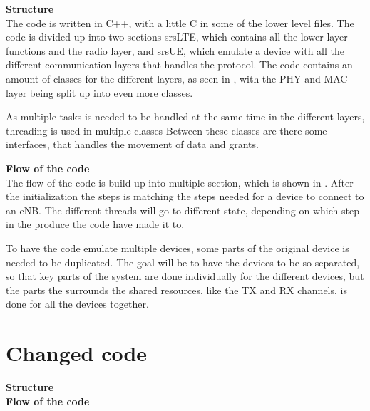 \textbf{Structure}\\
The code is written in C++, with a little C in some of the lower level files. The code is divided up into two sections srsLTE, which contains all the lower layer functions and the radio layer, and srsUE, which emulate a device with all the different communication layers that handles the protocol. The code contains an amount of classes for the different layers, as seen in , with the PHY and MAC layer being split up into even more classes. 



As multiple tasks is needed to be handled at the same time in the different layers, threading is used in multiple classes  Between these classes are there some interfaces, that handles the movement of data and grants. 

\textbf{Flow of the code}\\
The flow of the code is build up into multiple section, which is shown in . After the initialization the steps is matching the steps needed for a device to connect to an eNB. The different threads will go to different state, depending on which step in the produce the code have made it to.



To have the code emulate multiple devices, some parts of the original device is needed to be duplicated. The goal will be to have the devices to be so separated, so that key parts of the system are done individually for the different devices, but the parts the surrounds the shared resources, like the TX and RX channels, is done for all the devices together.
\section{Changed code}

\textbf{Structure}\\
\textbf{Flow of the code}\\